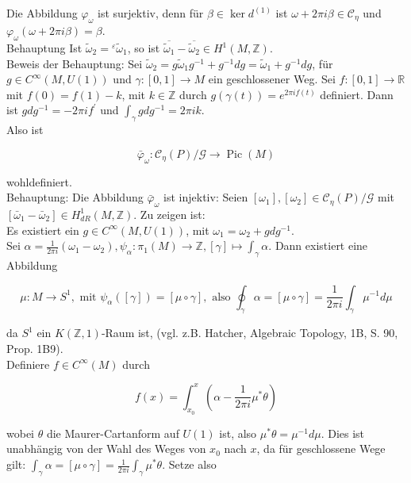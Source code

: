 \documentclass[10pt, letterpaper]{article}
\begin{document}
Die Abbildung $\varphi_{\omega}$ ist surjektiv, denn für $\beta \in \operatorname{ker} d^{(1)}$ ist $\omega+2 \pi i \beta \in \mathcal{C}_{\eta}$ und $\varphi_{\omega}(\omega+2 \pi i \beta)=\beta$.\\
Behauptung Ist $\tilde{\omega}_{2}={ }^{\varepsilon} \tilde{\omega}_{1}$, so ist $\overline{\tilde{\omega}_{1}}-\overline{\tilde{\omega}_{2}} \in H^{1}(M, \mathbb{Z})$.\\
Beweis der Behauptung: Sei $\tilde{\omega}_{2}=g \tilde{\omega}_{1} g^{-1}+g^{-1} d g=\tilde{\omega}_{1}+g^{-1} d g$, für $g \in C^{\infty}(M, U(1))$ und $\gamma:[0,1] \rightarrow M$ ein geschlossener Weg. Sei $f:[0,1] \rightarrow \mathbb{R}$ mit $f(0)=f(1)-k$, mit $k \in \mathbb{Z}$ durch $g(\gamma(t))=e^{2 \pi i f(t)}$ definiert. Dann ist $g d g^{-1}=-2 \pi i f^{\prime}$ und $\int_{\gamma} g d g^{-1}=2 \pi i k$.\\
Also ist

$$
\bar{\varphi}_{\omega}: \mathcal{C}_{\eta}(P) / \mathcal{G} \rightarrow \operatorname{Pic}(M)
$$

wohldefiniert.\\
Behauptung: Die Abbildung $\bar{\varphi}_{\omega}$ ist injektiv: Seien $\left[\omega_{1}\right],\left[\omega_{2}\right] \in \mathcal{C}_{\eta}(P) / \mathcal{G}$ mit $\left[\bar{\omega}_{1}-\bar{\omega}_{2}\right] \in H_{d R}^{1}(M, \mathbb{Z})$. Zu zeigen ist:\\
Es existiert ein $g \in C^{\infty}(M, U(1))$, mit $\omega_{1}=\omega_{2}+g d g^{-1}$.\\
Sei $\alpha=\frac{1}{2 \pi i}\left(\omega_{1}-\omega_{2}\right), \psi_{\alpha}: \pi_{1}(M) \rightarrow \mathbb{Z},[\gamma] \mapsto \int_{\gamma} \alpha$. Dann existiert eine Abbildung

$$
\mu: M \rightarrow S^{1}, \text { mit } \psi_{\alpha}([\gamma])=[\mu \circ \gamma], \text { also } \oint_{\gamma} \alpha=[\mu \circ \gamma]=\frac{1}{2 \pi i} \int_{\gamma} \mu^{-1} d \mu
$$

da $S^{1}$ ein $K(\mathbb{Z}, 1)$-Raum ist, (vgl. z.B. Hatcher, Algebraic Topology, 1B, S. 90, Prop. 1B9).\\
Definiere $f \in C^{\infty}(M)$ durch

$$
f(x)=\int_{x_{0}}^{x}\left(\alpha-\frac{1}{2 \pi i} \mu^{*} \theta\right)
$$

wobei $\theta$ die Maurer-Cartanform auf $U(1)$ ist, also $\mu^{*} \theta=\mu^{-1} d \mu$. Dies ist unabhängig von der Wahl des Weges von $x_{0}$ nach $x$, da für geschlossene Wege gilt: $\int_{\gamma} \alpha=[\mu \circ \gamma]=\frac{1}{2 \pi i} \int_{\gamma} \mu^{*} \theta$. Setze also
\end{document}
